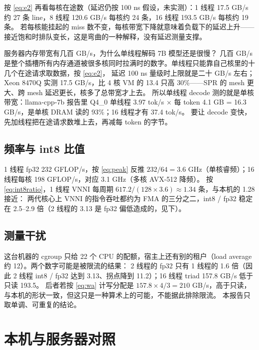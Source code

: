 \documentclass[11pt,a4paper]{ctexart}
\begin{document}
按 \cref{eq:e2} 再看每核在途数（延迟仍按 100 ns 假设，未实测）：1 线程 17.5 GB/s 约 27 条 line，8 线程 120.6 GB/s 每核约 24 条，16 线程 193.5 GB/s 每核约 19 条。
若每核能挂起的 miss 数不变，每核带宽下降就意味着负载下的延迟上升——接近饱和时排队变长，这是弯曲的一种解释，没有延迟测量支撑。

\begin{iqbox}{服务器内存带宽有几百 GB/s，为什么单线程解码 7B 模型还是很慢？}
几百 GB/s 是整个插槽所有内存通道被很多核同时拉满时的数字。单线程只能靠自己核里的十几个在途请求取数据，按 \cref{eq:e2}，
延迟 100 ns 量级时上限就是二十 GB/s 左右；Xeon 8470Q 实测 17.5 GB/s，比 4 核 VM 的 13.4 只高 30\%——SPR 的 mesh 更大、跨 mesh 延迟更长，核多了总带宽才上去。
所以单线程 decode 测的就是单核带宽：llama-cpp-7b 报告里 Q4\_0 单线程 3.97 tok/s × 每 token 4.1 GB = 16.3 GB/s，是单核 DRAM 读的 93\%；16 线程才有 37.4 tok/s。
要让 decode 变快，先加线程把在途请求数堆上去，再减每 token 的字节。
\end{iqbox}

\subsection{频率与 int8 比值}

1 线程 fp32 232 GFLOP/s，按 \cref{eq:peak} 反推 $232/64 = 3.6$ GHz（单核睿频）；16 线程每核 198 GFLOP/s，对应 3.1 GHz（多核 AVX-512 降频）。
按 \cref{eq:int8ratio}，1 线程 VNNI 每周期 $617.2 / (128 \times 3.6) \approx 1.34$ 条，与本机的 1.28 接近：
两代核心上 VNNI 的指令吞吐都约为 FMA 的三分之二，int8 / fp32 稳定在 2.5--2.9 倍（2 线程的 3.13 是 fp32 偏低造成的，见下）。

\subsection{测量干扰}\label{sec:throttle}

这台机器的 cgroup 只给 22 个 CPU 的配额，宿主上还有别的租户（load average 约 12）。两个数字可能是被限流的结果：
2 线程的 fp32 只有 1 线程的 1.6 倍（因此 2 线程 int8 / fp32 达到 3.13、拐点降到 11.2）；16 线程 triad 157.8 GB/s 低于只读 193.5。
后者若按 \cref{eq:wa} 计写分配是 $157.8\times4/3 = 210$ GB/s，高于只读，与本机的形状一致，但这只是一种算术上的可能，不能据此排除限流。
本报告只取单调、可重复的结论。

\section{本机与服务器对照}\label{sec:compare}
\end{document}
